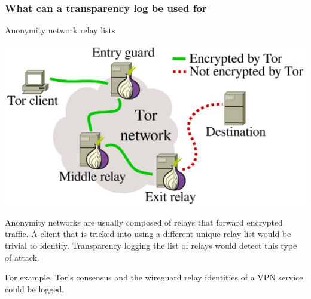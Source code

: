 \begin{frame}
  \frametitle{What can a transparency log be used for}

  \centerline{Anonymity network relay lists}

  \centerline{\includegraphics[scale=.2]{img/tor-network}}
  \pause

  Anonymity networks are usually composed of relays that forward
  encrypted traffic. A client that is tricked into using a different
  unique relay list would be trivial to identify. Transparency
  logging the list of relays would detect this type of attack.

  For example, Tor's consensus and the wireguard relay identities of a
  VPN service could be logged.
\end{frame}

